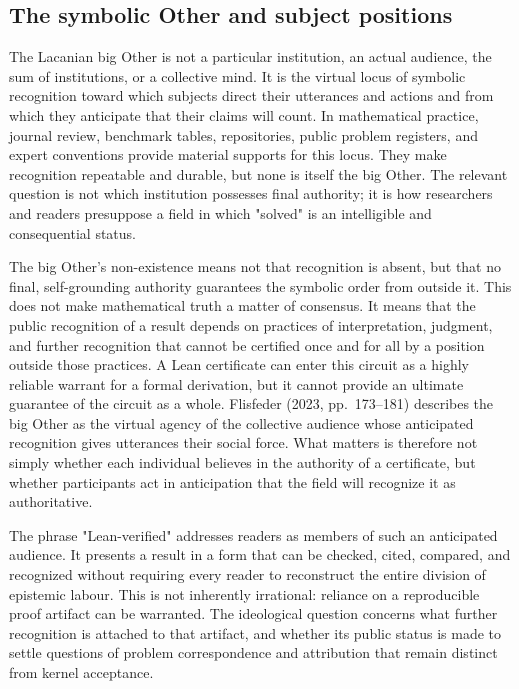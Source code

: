 \documentclass[pdflatex,sn-apa]{sn-jnl}
\begin{document}
\subsection{The symbolic Other and subject positions}

The Lacanian big Other is not a particular institution, an actual audience, the sum of institutions, or a collective mind. It is the virtual locus of symbolic recognition toward which subjects direct their utterances and actions and from which they anticipate that their claims will count. In mathematical practice, journal review, benchmark tables, repositories, public problem registers, and expert conventions provide material supports for this locus. They make recognition repeatable and durable, but none is itself the big Other. The relevant question is not which institution possesses final authority; it is how researchers and readers presuppose a field in which "solved" is an intelligible and consequential status.

The big Other's non-existence means not that recognition is absent, but that no final, self-grounding authority guarantees the symbolic order from outside it. This does not make mathematical truth a matter of consensus. It means that the public recognition of a result depends on practices of interpretation, judgment, and further recognition that cannot be certified once and for all by a position outside those practices. A Lean certificate can enter this circuit as a highly reliable warrant for a formal derivation, but it cannot provide an ultimate guarantee of the circuit as a whole. Flisfeder (2023, pp.~173--181) describes the big Other as the virtual agency of the collective audience whose anticipated recognition gives utterances their social force. What matters is therefore not simply whether each individual believes in the authority of a certificate, but whether participants act in anticipation that the field will recognize it as authoritative.

The phrase "Lean-verified" addresses readers as members of such an anticipated audience. It presents a result in a form that can be checked, cited, compared, and recognized without requiring every reader to reconstruct the entire division of epistemic labour. This is not inherently irrational: reliance on a reproducible proof artifact can be warranted. The ideological question concerns what further recognition is attached to that artifact, and whether its public status is made to settle questions of problem correspondence and attribution that remain distinct from kernel acceptance.
\end{document}
